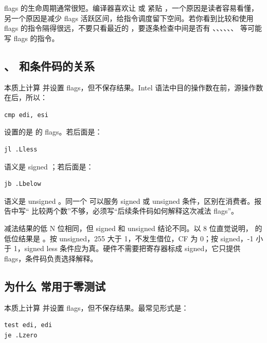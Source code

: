 flags 的生命周期通常很短。编译器喜欢让  或  紧贴 ，一个原因是读者容易看懂，另一个原因是减少 flags 活跃区间，给指令调度留下空间。若你看到比较和使用 flags 的指令隔得很远，不要只看最近的 ，要逐条检查中间是否有 、、、、、、 等可能写 flags 的指令。

\subsection{、 和条件码的关系}

 本质上计算  并设置 flags，但不保存结果。Intel 语法中目的操作数在前，源操作数在后，所以：

\begin{lstlisting}
cmp edi, esi
\end{lstlisting}

设置的是  的 flags。若后面是：

\begin{lstlisting}
jl .Lless
\end{lstlisting}

语义是 signed ；若后面是：

\begin{lstlisting}
jb .Lbelow
\end{lstlisting}

语义是 unsigned 。同一个  可以服务 signed 或 unsigned 条件，区别在消费者。报告中写“ 比较两个数”不够，必须写“后续条件码如何解释这次减法 flags”。

减法结果的低 N 位相同，但 signed 和 unsigned 结论不同。以 8 位直觉说明， 的低位结果是 。按 unsigned，255 大于 1，不发生借位，CF 为 0；按 signed，-1 小于 1，signed less 条件应为真。硬件不需要把寄存器标成 signed，它只提供 flags，条件码负责选择解释。

\subsection{为什么  常用于零测试}

 本质上计算  并设置 flags，但不保存结果。最常见形式是：

\begin{lstlisting}
test edi, edi
je .Lzero
\end{lstlisting}

